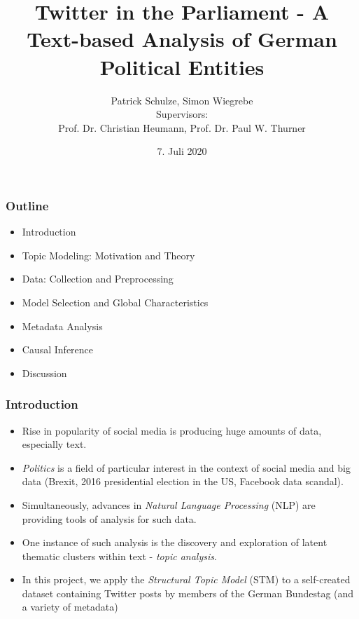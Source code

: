 \documentclass[xcolor=dvipsnames]{beamer}
\title{Twitter in the Parliament - A Text-based Analysis of German Political Entities}
\date{7. Juli 2020}
\author[author1]{Patrick Schulze, Simon Wiegrebe\\[10mm]{\small Supervisors:\\ Prof. Dr. Christian Heumann, Prof. Dr. Paul W. Thurner}}
\begin{document}
\begin{frame}
\titlepage
\end{frame}


\section{}
\begin{frame}
\frametitle{Outline}
\begin{itemize}
\item Introduction
\item Topic Modeling: Motivation and Theory
\item Data: Collection and Preprocessing
\item Model Selection and Global Characteristics
\item Metadata Analysis
\item Causal Inference
\item Discussion
\end{itemize}
\end{frame}

\begin{frame}
\frametitle{Introduction}
\begin{itemize}
\item Rise in popularity of social media is producing huge amounts of data, especially text.
\item \textit{Politics} is a field of particular interest in the context of social media and big data (Brexit, 2016 presidential election in the US, Facebook data scandal).
\item Simultaneously, advances in \textit{Natural Language Processing} (NLP) are providing tools of analysis for such data.
\item One instance of such analysis is the discovery and exploration of latent thematic clusters within text - \textit{topic analysis}.
\item In this project, we apply the \textit{Structural Topic Model} (STM) to a self-created dataset containing Twitter posts by members of the German Bundestag (and a variety of metadata) 
\end{itemize}
\end{frame}
\end{document}
